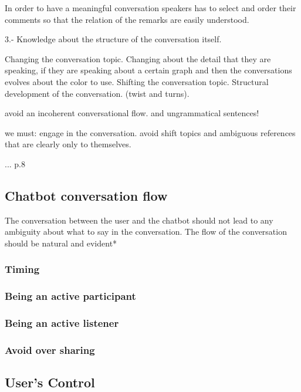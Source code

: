 \documentclass[a4paper,10pt]{article}
\begin{document}
In order to have a meaningful conversation speakers has to select and order their comments so that the relation of the remarks are easily understood. 

3.- Knowledge about the structure of the conversation itself. 

Changing the conversation topic. Changing about the detail that they are speaking, if they are speaking about a certain graph and then the conversations evolves about the color to use. Shifting the conversation topic. Structural development of the conversation. (twist and turns).

avoid an incoherent conversational flow. and ungrammatical sentences!

we must:
engage in the conversation.
avoid shift topics and ambiguous references that are clearly only to themselves. 

... p.8

\subsection*{Chatbot conversation flow}
The conversation between the user and the chatbot should not lead to any ambiguity about what to say in the conversation. The flow of the conversation should be natural and evident*

\subsubsection*{Timing}

\subsubsection*{Being an active participant}

\subsubsection*{Being an active listener}

\subsubsection*{Avoid over sharing}




\subsection*{User's Control}
\end{document}
